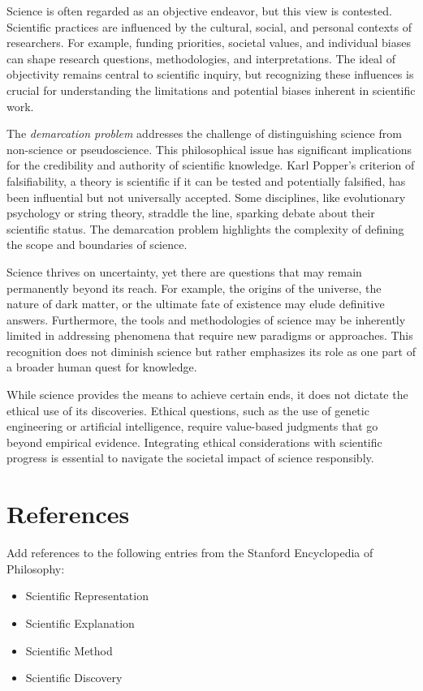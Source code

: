 Science is often regarded as an objective endeavor, but this view is contested. Scientific practices are influenced by the cultural, social, and personal contexts of researchers. For example, funding priorities, societal values, and individual biases can shape research questions, methodologies, and interpretations. The ideal of objectivity remains central to scientific inquiry, but recognizing these influences is crucial for understanding the limitations and potential biases inherent in scientific work.

The \emph{demarcation problem} addresses the challenge of distinguishing science from non-science or pseudoscience. This philosophical issue has significant implications for the credibility and authority of scientific knowledge. Karl Popper's criterion of falsifiability, a theory is scientific if it can be tested and potentially falsified, has been influential but not universally accepted. Some disciplines, like evolutionary psychology or string theory, straddle the line, sparking debate about their scientific status. The demarcation problem highlights the complexity of defining the scope and boundaries of science.

Science thrives on uncertainty, yet there are questions that may remain permanently beyond its reach. For example, the origins of the universe, the nature of dark matter, or the ultimate fate of existence may elude definitive answers. Furthermore, the tools and methodologies of science may be inherently limited in addressing phenomena that require new paradigms or approaches. This recognition does not diminish science but rather emphasizes its role as one part of a broader human quest for knowledge.

While science provides the means to achieve certain ends, it does not dictate the ethical use of its discoveries. Ethical questions, such as the use of genetic engineering or artificial intelligence, require value-based judgments that go beyond empirical evidence. Integrating ethical considerations with scientific progress is essential to navigate the societal impact of science responsibly.


%
%

\section*{References}

{\color{red} Add references to the following entries from the Stanford Encyclopedia of Philosophy:

\begin{itemize}
\item Scientific Representation
\item Scientific Explanation
\item Scientific Method
\item Scientific Discovery
\end{itemize}

}


